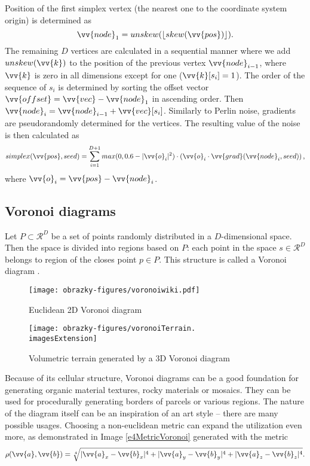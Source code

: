 Position of the first simplex vertex (the nearest one to the coordinate system origin) is determined as
\begin{equation}
	\vv{node}_1 = unskew(\lfloor skew(\vv{pos}) \rfloor) \text{.}
\end{equation}
The remaining $D$ vertices are calculated in a sequential manner where we add $unskew(\vv{k})$ to the position of the previous vertex $\vv{node}_{i-1}$, where $\vv{k}$ is zero in all dimensions except for one ($\vv{k}[s_i] = 1$). The order of the sequence of $s_i$ is determined by sorting the offset vector $\vv{offset} = \vv{vec} - \vv{node}_1$ in ascending order. Then $\vv{node}_i = \vv{node}_{i-1} + \vv{vec}[s_i]$. Similarly to Perlin noise, gradients are pseudorandomly determined for the vertices. The resulting value of the noise is then calculated as
\begin{equation}
	simplex(\vv{pos}, seed) = \sum_{i=1}^{D+1} max(0, 0.6 - |\vv{o}_i|^2) \cdot \left( \vv{o}_i \cdot \vv{grad}(\vv{node}_i, seed) \right) \text{,}
\end{equation}
where $\vv{o}_i = \vv{pos} - \vv{node}_i$.

\subsection{Voronoi diagrams} \label{voronoiDiagrams}
Let $P \subset \mathcal{R}^D$ be a set of points randomly distributed in a $D$-dimensional space. Then the space is divided into regions based on $P$: each point in the space $s \in \mathcal{R}^D$ belongs to region of the closes point $p \in P$. This structure is called a Voronoi diagram \cite{Boissonnat2010}.

\begin{figure}[H]
	\centering
	\begin{minipage}[t]{0.48\textwidth}
		\centering
		\texttt{[image: obrazky-figures/voronoiwiki.pdf]}
		\caption{Euclidean 2D Voronoi diagram}
	\end{minipage}
	\hfill
	\begin{minipage}[t]{0.48\textwidth}
		\centering
		\texttt{[image: obrazky-figures/voronoiTerrain.\\imagesExtension]}
		\caption{Volumetric terrain generated by a 3D Voronoi diagram}
	\end{minipage}
\end{figure}

Because of its cellular structure, Voronoi diagrams can be a good foundation for generating organic material textures, rocky materials or mosaics. They can be used for procedurally generating borders of parcels or various regions. The nature of the diagram itself can be an inspiration of an art style -- there are many possible usages. Choosing a non-euclidean metric can expand the utilization even more, as demonstrated in Image \ref{e4MetricVoronoi} generated with the metric
\begin{equation}
	\rho(\vv{a}, \vv{b}) = \sqrt[4]{|\vv{a}_x - \vv{b}_x|^4 + |\vv{a}_y - \vv{b}_y|^4 + |\vv{a}_z - \vv{b}_z|^4} \text{.}
\end{equation}

